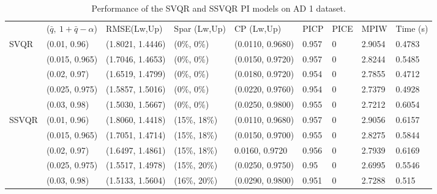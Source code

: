 \documentclass[10pt]{article} %
\begin{document}
\begin{table}[]
{\fontsize{9}{9}\selectfont \begin{tabular}{|l|l|l|l|l|l|l|l|l|}
\cline{1-9}
                      & ($\bar{q},~1+\bar{q}-\alpha$)              & RMSE(Lw,Up)   & Spar (Lw,Up)     & CP (Lw,Up)     & PICP  & PICE & MPIW   & Time (s) \\ \cline{1-9} 
\multirow{5}{*}{SVQR} & (0.01, 0.96)   & (1.8021, 1.4446) & (0\%, 0\%) & (0.0110, 0.9680) & 0.957 & 0  & 2.9054 & 0.4783   \\  
                      & (0.015, 0.965) & (1.7046, 1.4653) & (0\%, 0\%) & (0.0150, 0.9720) & 0.957 & 0  & 2.8244 & 0.5485   \\  
                      & (0.02, 0.97)   & (1.6519, 1.4799) & (0\%, 0\%) & (0.0180, 0.9720) & 0.954 & 0  & 2.7855 & 0.4712   \\  
                      & (0.025, 0.975) & (1.5857, 1.5016) & (0\%, 0\%) & (0.0220, 0.9760) & 0.954 & 0  & 2.7379 & 0.4928   \\ 
                      & (0.03, 0.98)   & (1.5030, 1.5667) & (0\%, 0\%) & (0.0250, 0.9800) & 0.955 & 0  & 2.7212 & 0.6054   \\  \hline
                       \multirow{5}{*}{SSVQR}   &  (0.01, 0.96) & (1.8060, 1.4418) & (15\%, 18\%) & (0.0110, 0.9680) & 0.957 & 0 & 2.9056 & 0.6157 \\  
       & (0.015, 0.965) & (1.7051, 1.4714) & (15\%, 18\%) & (0.0150,  0.9700) & 0.955 & 0 & 2.8275 & 0.5844 \\ 
       & (0.02, 0.97) & (1.6497, 1.4861) & (15\%, 18\%) & 0.0160, 0.9720 & 0.956 & 0 & 2.7939 & 0.6169 \\ 
       & (0.025, 0.975) & (1.5517, 1.4978) & (15\%, 20\%) & (0.0250, 0.9750) & 0.95 & 0 & 2.6995 & 0.5546 \\ 
       & (0.03, 0.98) & (1.5133, 1.5604) & (16\%, 20\%) & (0.0290, 0.9800) & 0.951 & 0 & 2.7288 & 0.515 \\ \hline
\end{tabular}}
\caption{Performance of the SVQR and SSVQR PI models on AD 1 dataset.}
\label{AD1}
\end{table}
\end{document}
